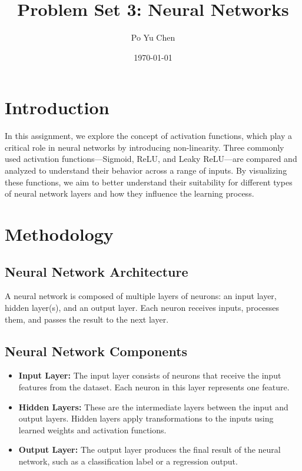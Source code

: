 \documentclass{article}
\title{Problem Set 3: Neural Networks}
\author{Po Yu Chen}
\date{\today}
\begin{document}
\maketitle

\section{Introduction}
In this assignment, we explore the concept of activation functions, which play a critical role in neural networks by introducing non-linearity. Three commonly used activation functions—Sigmoid, ReLU, and Leaky ReLU—are compared and analyzed to understand their behavior across a range of inputs. By visualizing these functions, we aim to better understand their suitability for different types of neural network layers and how they influence the learning process.


\section{Methodology}

\subsection{Neural Network Architecture}

A neural network is composed of multiple layers of neurons: an input layer, hidden layer(s), and an output layer. Each neuron receives inputs, processes them, and passes the result to the next layer.

\subsection*{Neural Network Components}
\begin{itemize}
    \item \textbf{Input Layer:} The input layer consists of neurons that receive the input features from the dataset. Each neuron in this layer represents one feature.
    \item \textbf{Hidden Layers:} These are the intermediate layers between the input and output layers. Hidden layers apply transformations to the inputs using learned weights and activation functions.
    \item \textbf{Output Layer:} The output layer produces the final result of the neural network, such as a classification label or a regression output.
\end{itemize}
\end{document}

